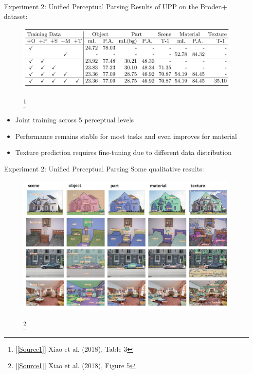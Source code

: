 \documentclass{beamer}
\newcommand\blfootnote[1]{
  \begingroup
  \renewcommand\thefootnote{}\footnote{#1}
  \addtocounter{footnote}{-1}
  \endgroup
}
\begin{document}
\begin{frame}{Experiment 2: Unified Perceptual Parsing}
  Results of UPP on the Broden+ dataset:
  \begin{figure}
    \centering
    \includegraphics[width=\textwidth]{Images/Table3.png}
    \blfootnote{[\ref{Source1}] Xiao et al. (2018), Table 3}
  \end{figure}
  \vspace{-1cm}
  \begin{itemize}
    \item Joint training across 5 perceptual levels
    \item Performance remains stable for most tasks and even improves for material
    \item Texture prediction requires fine-tuning due to different data distribution
  \end{itemize}
\end{frame}

\begin{frame}{Experiment 2: Unified Perceptual Parsing}
  Some qualitative results:
  \vspace{-0.25cm}
  \begin{figure}
    \centering
    \includegraphics[width=\textwidth]{Images/Figure5 Springer.png}
    \blfootnote{[\ref{Source1}] Xiao et al. (2018), Figure 5}
  \end{figure}
  \vspace{-1cm}
\end{frame}
\end{document}

